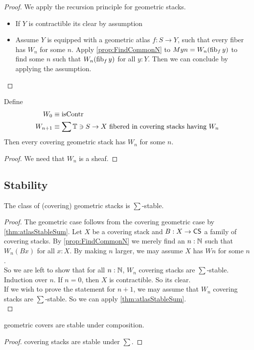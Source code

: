 \begin{proof}
		We apply the recursion principle for geometric stacks.
	\begin{itemize}
		\item If $Y$ is contractible its clear by assumption
		\item Assume $Y$ is equipped with a geometric atlas $f : S \to Y$, such that every fiber has $W_n$ for some $n$. Apply \ref{prop:FindCommonN} to $M y n = W_n (\operatorname{fib}_f y)$ to find some $n$ such that $W_n (\operatorname{fib}_f y)$ for all $y : Y$.
		Then we can conclude by applying the assumption.
	
	\end{itemize}
\end{proof}


\begin{corollary}
	Define \begin{align*}
		W_0 &\equiv \operatorname{isContr} \\
		W_{n+1} &\equiv \sum \mathbb{T} \ni S \to X \text{ fibered in covering stacks having } W_n 
	\end{align*}
	Then every covering geometric stack has $W_n$ for some $n$.
\end{corollary}
\begin{proof}
	We need that $W_n$ is a sheaf.
\end{proof}
\subsection{Stability}
\begin{theorem}{\label{thm:CSSum}}
	The class of (covering) geometric stacks is $\sum$-stable.
\end{theorem}
\begin{proof}
	The geometric case follows from the covering geometric case by \ref{thm:atlasStableSum}.
	Let $X$ be a covering stack and $B : X \to \mathsf{CS}$ a family of covering stacks.
	By \ref{prop:FindCommonN} we merely find an $n : \mathbb{N}$ such that $W_n (B x)$ for all $x : X$. By making $n$ larger, we may assume $X$ has $W n$ for some $n$. \\
	So we are left to show that for all $n : \mathbb{N}$, $W_n$ covering stacks are $\sum$-stable. \\
	
	
	Induction over $n$. If $n = 0$, then $X$ is contractible. So its clear. \\
	If we wish to prove the statement for $n+1$, we may assume that $W_n$ covering stacks are $\sum$-stable. So we can apply \ref{thm:atlasStableSum}. \\

\end{proof}
\begin{lemma}{\label{lemma:coversstableundercomp}}
	geometric covers are stable under composition.
\end{lemma}
\begin{proof}
	covering stacks are stable under $\sum$.
\end{proof}


